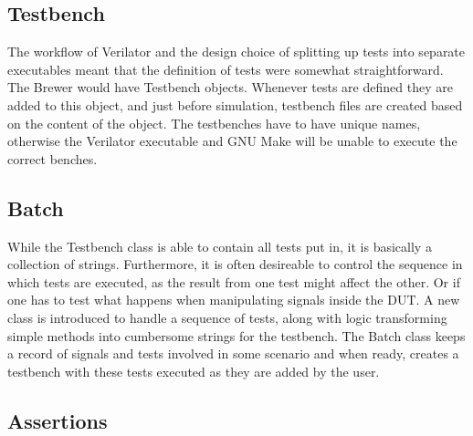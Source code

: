 \subsection{Testbench}
The workflow of Verilator and the design choice of splitting up tests into separate executables meant that the definition of tests were somewhat straightforward. The Brewer would have Testbench objects. Whenever tests are defined they are added to this object, and just before simulation, testbench files are created based on the content of the object. The testbenches have to have unique names, otherwise the Verilator executable and GNU Make will be unable to execute the correct benches.
\subsection{Batch}
While the Testbench class is able to contain all tests put in, it is basically a collection of strings. Furthermore, it is often desireable to control the sequence in which tests are executed, as the result from one test might affect the other. Or if one has to test what happens when manipulating signals inside the DUT. A new class is introduced to handle a sequence of tests, along with logic transforming simple methods into cumbersome strings for the testbench. The Batch class keeps a record of signals and tests involved in some scenario and when ready, creates a testbench with these tests executed as they are added by the user.
\subsection{Assertions}
